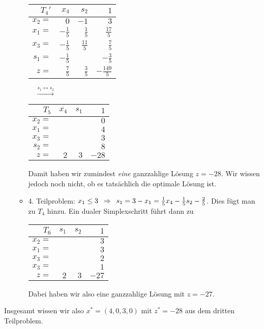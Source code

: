 \begin{beispiel}
\begin{itemize}[leftmargin=*]
\begin{itemize}
			\begin{center}
				\begin{tabular}{r|rr|r}
					$T_4'$ & $x_4$ & $s_2$ & $1$ \\ \hline
					$x_2 = $ & $0$ & $-1$ & $3$ \\
					$x_1 = $ & $-\frac{1}{5}$ & $\frac{1}{5}$ & $\frac{17}{5}$ \\
					$x_3 = $ & $-\frac{1}{5}$ & $\frac{11}{5}$ & $\frac{7}{5}$ \\
					$s_1 = $ & $-\frac{1}{5}$ & \fbox{$\frac{1}{5}$} & $-\frac{3}{5}$ \\ \hline
					$z = $   & $\frac{7}{5}$ & $\frac{3}{5}$ & $-\frac{149}{5}$
				\end{tabular}
				$\quad \overset{s_1 \leftrightarrow s_2}{\longrightarrow} \quad$	
				\begin{tabular}{r|rr|r}
					$T_5$ & $x_4$ & $s_1$ & $1$ \\ \hline
					$x_2 = $ &  &  & $0$ \\
					$x_1 = $ &  &  & $4$ \\
					$x_3 = $ &  &  & $3$ \\
					$s_2 = $ &  &  & $8$ \\ \hline
					$z = $   & $2$ & $3$ & $-28$
				\end{tabular}
			\end{center}
			Damit haben wir zumindest \textit{eine} ganzzahlige Lösung $z = -28$. Wir wissen jedoch noch nicht, ob es tatsächlich die optimale Lösung ist.
			\item 4. Teilproblem: $x_1 \le 3 \enskip \Rightarrow \enskip s_1 = 3-x_1 = \frac{1}{5} x_4 - \frac{1}{5} s_2 - \frac{2}{5}$. Dies fügt man zu $T_4$ hinzu. Ein dualer Simplexschritt führt dann zu
			\begin{center}
				\begin{tabular}{r|rr|r}
					$T_6$ & $s_1$ & $s_2$ & $1$ \\ \hline
					$x_2 = $ &  &  & $3$ \\
					$x_1 = $ &  &  & $3$ \\
					$x_3 = $ &  &  & $2$ \\
					$x_3 = $ &  &  & $1$ \\ \hline
					$z = $   & $2$ & $3$ & $-27$
				\end{tabular}
			\end{center}
			Dabei haben wir also eine ganzzahlige Lösung mit $z = -27$.
		\end{itemize}
	\end{itemize}
	Insgesamt wissen wir also $x^\ast = (4,0,3,0)$ mit $z^\ast = -28$ aus dem dritten Teilproblem.
\end{beispiel}


